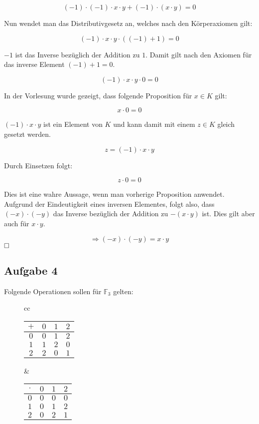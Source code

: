 \documentclass[11pt, a4paper]{article}
\begin{document}
		\[ (-1) \cdot (-1) \cdot x \cdot y + (-1)\cdot(x\cdot y) = 0 \]

		Nun wendet man das Distributivgesetz an, welches nach den Körperaxiomen gilt:

		\[ (-1)\cdot x\cdot y \cdot ((-1)+1) = 0 \]

		$-1$ ist das Inverse bezüglich der Addition zu $1$. Damit gilt nach den Axiomen für das inverse Element $(-1) + 1 = 0$.

		\[ (-1)\cdot x\cdot y \cdot 0 = 0 \]

		In der Vorlesung wurde gezeigt, dass folgende Proposition für $x \in K$ gilt:

		\[ x\cdot 0 = 0 \]

		$(-1)\cdot x\cdot y$ ist ein Element von $K$ und kann damit mit einem $z \in K$ gleich gesetzt werden.

		\[ z = (-1)\cdot x\cdot y \]

		Durch Einsetzen folgt:

		\[ z \cdot 0 = 0 \]

		Dies ist eine wahre Aussage, wenn man vorherige Proposition anwendet. Aufgrund der Eindeutigkeit eines inversen Elementes, folgt also, dass $(-x)\cdot(-y)$ das Inverse bezüglich der Addition zu $-(x\cdot y)$ ist. Dies gilt aber auch für $x\cdot y$.

		\[ \Rightarrow (-x)\cdot(-y) = x\cdot y \] 
		$\hfill\Box$

		\newpage


	\subsection*{Aufgabe 4}


		Folgende Operationen sollen für $\mathbb{F}_3$ gelten: \\


		\begin{figure}[H]
		\center

		\begin{tabular}[c]{cc}
			\begin{tabular}[c]{|c||c|c|c|}
				\hline
				$+$ & $0$ & $1$ & $2$ \\
				\hline \hline
				$0$ & $0$ & $1$ & $2$ \\
				\hline
				$1$ & $1$ & $2$ & $0$ \\
				\hline
				$2$ & $2$ & $0$ & $1$ \\
				\hline
			\end{tabular}
		
			&

			\begin{tabular}[c]{|c||c|c|c|}
				\hline
				$\cdot$ & $0$ & $1$ & $2$ \\
				\hline \hline
				$0$ & $0$ & $0$ & $0$ \\
				\hline
				$1$ & $0$ & $1$ & $2$ \\
				\hline
				$2$ & $0$ & $2$ & $1$ \\
				\hline
			\end{tabular} \\

		\end{tabular}

		\end{figure}
\end{document}
